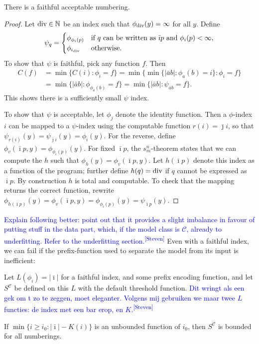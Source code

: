 \documentclass{style/llncs}
\newcommand{\C}{\mathscr C}
\newcommand{\N}{\mathbb N}
\newcommand{\tn}[1]{\textnormal{#1}}
\newcommand{\s}{S}
\newcommand{\sdr}[1]{\textcolor{blue}{\small #1\textsuperscript{[Steven]} }}
\begin{document}
\begin{lemma}
  There is a faithful acceptable numbering.
\end{lemma}
\begin{proof}
Let $\tn{div} \in \N$ be an index such that $\phi_{\tn{div}}(y)=\infty$ for all $y$. Define
  \[\psi_q=\begin{cases}
    \phi_{\phi_i(p)}&\tn{if $q$ can be written as $\bar\imath p$ and $\phi_i(p)<\infty$,}\\
    \phi_{i_\tn{div}}&\tn{otherwise.}\end{cases}
  \]
  To show that $\psi$ is faithful, pick any function $f$. Then
\[\begin{split}
C(f)&=\min\{C(i):\phi_i=f\} =\min\{\min\{|\bar a b|:\phi_a(b)=i\}:\phi_i=f\} \\
& =\min\{|\bar a b|:\phi_{\phi_a(b)}=f\}
 =\min\{|\bar a b|:\psi_{\bar a b}=f\}.
\end{split}\]
This shows there is a sufficiently small $\psi$ index.

To show that $\psi$ is acceptable, let $\phi_j$ denote the identity
function. Then a $\phi$-index $i$ can be mapped to a $\psi$-index
using the computable function $r(i)=\bar\jmath i$, so that
$\psi_{r(i)}(y)=\psi_{\bar\jmath i}(y)=\phi_i(y)$. For the reverse,
define $\phi_v(\bar\imath p, y)=\phi_{\phi_i(p)}(y)$. For fixed
$\bar\imath p$, the 
$s^n_m$-theorem \cite{kleene193notation} states that we can compute the $h$
such that $\phi_h(y)=\phi_v(\bar\imath p,y)$. Let $h(\bar\imath p)$
denote this index as a function of the program; further define
$h(q)=\tn{div}$ if $q$ cannot be expressed as $\bar\imath p$. By
construction $h$ is total and computable. To check that the mapping
returns the correct function, rewrite $\phi_{h(\bar\imath
  p)}(y)=\phi_v(\bar\imath p,y)=\phi_{\phi_i(p)}(y)=\psi_{\bar\imath p}(y)$.
\end{proof}
\sdr{Explain following better: point out that it provides a slight imbalance in favour of putting stuff in the data part, which, if the model class is $\C$, already to underfitting. Refer to the underfitting section.}
Even with a faithful index, we can fail if the prefix-function used to separate the model from its input is inefficient:
\begin{lemma}
Let $L(\phi_i) = |\bar\imath|$ for a faithful index, and some prefix encoding function, and let $\s^\C$ be defined on this $L$ with the default threshold function. \sdr{Dit wringt als een gek om t zo te zeggen, moet eleganter. Volgens mij gebruiken we maar twee $L$ functies: de index met een bar erop, en $K$.}

If $\min\{i\ge i_0:|\bar\imath|-K(i)\}$ is an unbounded function of $i_0$, then $\s^\C$ is bounded for all numberings.\label{lemma:prefix-inefficiency}
\end{lemma}
\end{document}
